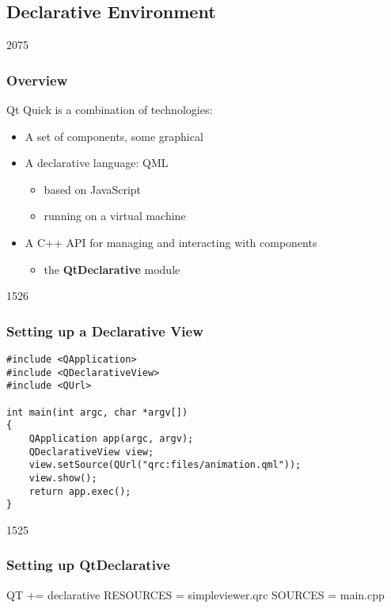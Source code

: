 %
%
%
%

\subsection{Declarative Environment}

\begin{slide}{2075}\frametitle{Overview}

Qt Quick is a combination of technologies:

\begin{itemize}
\item A set of components, some graphical
\item A declarative language: QML
  \begin{itemize}
  \item based on JavaScript
  \item running on a virtual machine
  \end{itemize}
\item A C++ API for managing and interacting with components
  \begin{itemize}
  \item the \textbf{QtDeclarative} module
  \end{itemize}
\end{itemize}

\end{slide}

\begin{slide}[fragile]{1526}\frametitle{Setting up a Declarative View}

\begin{lstlisting}
#include <QApplication>
#include <QDeclarativeView>
#include <QUrl>

int main(int argc, char *argv[])
{
    QApplication app(argc, argv);
    QDeclarativeView view;
    view.setSource(QUrl("qrc:files/animation.qml"));
    view.show();
    return app.exec();
}
\end{lstlisting}

\end{slide}

\begin{slide}[fragile]{1525}\frametitle{Setting up QtDeclarative}

\begin{qmake}
QT       += declarative
RESOURCES = simpleviewer.qrc
SOURCES   = main.cpp
\end{qmake}

\end{slide}
